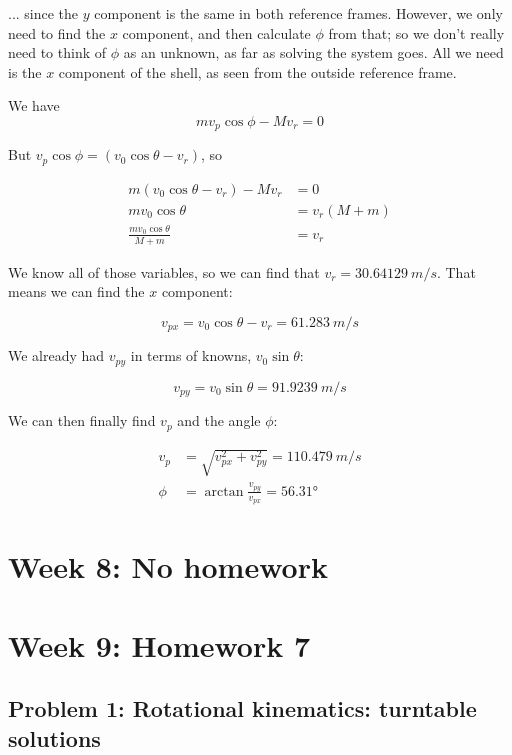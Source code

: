 \documentclass[12pt,a4paper]{report}
\begin{document}
... since the $y$ component is the same in both reference frames. However, we only need to find the $x$ component, and then calculate $\phi$ from that; so we don't really need to think of $\phi$ as an unknown, as far as solving the system goes. All we need is the $x$ component of the shell, as seen from the outside reference frame.

We have
\begin{equation}
m v_p \cos \phi - M v_r = 0
\end{equation}

But $v_p \cos \phi = (v_0 \cos \theta - v_r)$, so

\begin{align}
m (v_0 \cos \theta - v_r) - M v_r &= 0\\
m v_0 \cos \theta &= v_r(M + m)\\
\frac{m v_0 \cos \theta}{M + m} &= v_r
\end{align}

We know all of those variables, so we can find that $v_r = \SI{30.64129}{m/s}$. That means we can find the $x$ component:

\begin{equation}
v_{px} = v_0 \cos \theta - v_r = \SI{61.283}{m/s}
\end{equation}

We already had $v_{py}$ in terms of knowns, $v_0 \sin \theta$:

\begin{equation}
v_{py} = v_0 \sin \theta = \SI{91.9239}{m/s}
\end{equation}

We can then finally find $v_p$ and the angle $\phi$:

\begin{align}
v_p  &= \sqrt{v_{px}^2 + v_{py}^2} = \SI{110.479}{m/s}\\
\phi &= \arctan \frac{v_{py}}{v_{px}} = \ang{56.31}
\end{align}

\chapter{Week 8: No homework}

\chapter{Week 9: Homework 7}

\section{Problem 1: Rotational kinematics: turntable solutions}
\end{document}
